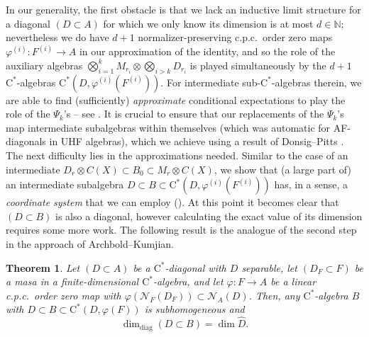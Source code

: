 \documentclass[11pt,a4paper]{amsart}
\newcounter{theoremintro}
\newtheorem{theoremi}[theoremintro]{Theorem}
\theoremstyle{definition}
\numberwithin{equation}{section}
\newcommand{\mc}[1]{\mathcal{#1}}
\newcommand{\bb}[1]{\mathbb{#1}}
\begin{document}
In our generality, the first obstacle is that we lack an inductive limit structure for a diagonal $(D\subset A)$ for which we only know its dimension is at most $d\in\bb{N}$; nevertheless we do have $d+1$ normalizer-preserving c.p.c.\ order zero maps $\varphi^{(i)}\colon F^{(i)}\to A$ in our approximation of the identity, and so the role of the auxiliary algebras $\bigotimes_{i=1}^kM_{r_i}\otimes\bigotimes_{i>k}D_{r_i}$ is played simultaneously by the $d+1$ $\mathrm{C}^\ast$-algebras $\mathrm{C}^\ast(D,\varphi^{(i)}(F^{(i)}))$. For intermediate sub-$\mathrm{C}^\ast$-algebras therein, we are able to find (sufficiently) \emph{approximate} conditional expectations to play the role of the $\Psi_k$'s -- see . It is crucial to ensure that our replacements of the $\Psi_k$'s map intermediate subalgebras within themselves (which was automatic for AF-diagonals in UHF algebras), which we achieve using a result of Donsig--Pitts \cite[Proposition~3.10]{DonsigPitts08}. The next difficulty lies in the approximations needed. Similar to the case of an intermediate $D_r\otimes C(X)\subset B_0\subset M_r\otimes C(X)$, we show that (a large part of) an intermediate subalgebra $D\subset B\subset \mathrm{C}^\ast(D,\varphi^{(i)}(F^{(i)}))$ has, in a sense, a \emph{coordinate system} that we can employ (). At this point it becomes clear that $(D\subset B)$ is also a diagonal, however calculating the exact value of its dimension requires some more work. The following result is the analogue of the second step in the approach of Archbold--Kumjian.

\begin{theoremi}\label{thmi:C}
Let $(D\subset A)$ be a $\mathrm{C}^\ast$-diagonal with $D$ separable, let $(D_F\subset F)$ be a masa in a finite-dimensional $\mathrm{C}^\ast$-algebra, and let  $\varphi\colon F\to A$ be a linear c.p.c.\ order zero map with $\varphi(\mc{N}_F(D_F))\subset \mc{N}_A(D)$. Then, any $\mathrm{C}^\ast$-algebra $B$ with $D\subset B\subset\mathrm{C}^\ast(D,\varphi(F))$ is subhomogeneous and 
\[
\dim_\mathrm{diag}(D\subset B)=\dim\widehat{D}.
\]
\end{theoremi}
\end{document}
